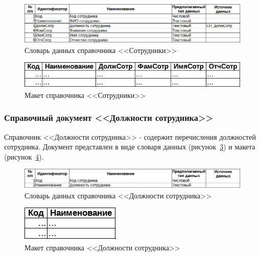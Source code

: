 \begin{figure}[!h]
    \centering
    \includegraphics[width=14cm]
        {_docs/СП_Сотр_типы.jpg}
    \caption{Словарь данных справочника <<Сотрудники>>}
    \label{fig:CP_Sotr_tipi}
\end{figure}

\begin{figure}[!h]
    \centering
    \includegraphics[]
        {_docs/СП_Сотр_макет.jpg}
    \caption{Макет справочника <<Сотрудники>>}
    \label{fig:CP_Sotr_maket}
\end{figure}

\newpage

\subsubsection{Справочный документ <<Должности сотрудника>>}

Справочник <<Должности сотрудника>> - содержит перечисления должностей сотрудника.
Документ представлен в виде словаря данных (рисунок~\ref{fig:CP_DoljnCotr_tipi})
и макета (рисунок~\ref{fig:CP_DoljnCotr_maket}).

\begin{figure}[!h]
    \centering
    \includegraphics[width=14cm]
        {_docs/СП_ДолжнСотр_типы.jpg}
    \caption{Словарь данных справочника <<Должности сотрудника>>}
    \label{fig:CP_DoljnCotr_tipi}
\end{figure}

\begin{figure}[!h]
    \centering
    \includegraphics[]
        {_docs/СП_ДолжнСотр_макет.jpg}
    \caption{Макет справочника <<Должности сотрудника>>}
    \label{fig:CP_DoljnCotr_maket}
\end{figure}

